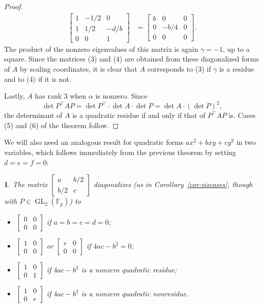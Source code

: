 \documentclass[10pt,a4paper]{amsart}
\numberwithin{equation}{section}
\numberwithin{figure}{section}
\theoremstyle{definition}
\theoremstyle{remark}
\theoremstyle{plain}
\theoremstyle{plain}
\newtheorem{cor}{\protect\corollaryname}[section]
\theoremstyle{definition}
\theoremstyle{plain}
\theoremstyle{plain}
\providecommand{\corollaryname}{Corollary}
\newcommand{\F}{\mathbb{F}}
\newcommand{\GL}{\operatorname{GL}}
\begin{document}
\begin{proof}
\begin{align*}
\begin{bmatrix}
			1 & -1/2 & 0\\
			1 & 1/2 & -d/b\\
			0 & 0 & 1
		\end{bmatrix}
		&=
		\begin{bmatrix}
			b&0&0\\
			0&-b/4&0\\
			0&0&0
		\end{bmatrix}.
	\end{align*}
	The product of the nonzero eigenvalues of this matrix is again $\gamma=-1$, up to a square. Since the matrices (3) and (4) are obtained from these diagonalized forms of $A$ by scaling coordinates, it is clear that $A$ corresponds to (3) if $\gamma$ is a residue and to (4) if it is not.
	
	Lastly, $A$ has rank $3$ when $\alpha$ is nonzero. Since
	\begin{equation*}
	\det P^\top AP=\det P^\top \cdot\det A\cdot\det P=\det A\cdot(\det P)^2,
	\end{equation*}
	the determinant of $A$ is a quadratic residue if and only if that of $P^\top AP$ is. Cases (5) and (6) of the theorem follow.
	\end{proof}
	
	We will also need an analogous result for quadratic forms $ax^2+bxy+cy^2$ in two variables, which follows immediately from the previous theorem by setting $d=e=f=0$:
	\begin{cor}\label{cor:diag-P1}
	The matrix $\left[\begin{smallmatrix}a&b/2\\b/2&c\end{smallmatrix}\right]$ diagonalizes (as in Corollary~\ref{cor:sixcases}, though with $P \in \GL_2(\F_p)$) to
	\begin{itemize}
	\item $\left[\begin{smallmatrix}0&0\\0&0\end{smallmatrix}\right]$ if $a=b=c=d=0$;
	\item $\left[\begin{smallmatrix}1&0\\0&0\end{smallmatrix}\right]$ or $\left[\begin{smallmatrix}r&0\\0&0\end{smallmatrix}\right]$ if $4ac-b^2=0$;
	\item $\left[\begin{smallmatrix}1&0\\0&1\end{smallmatrix}\right]$ if $4ac-b^2$ is a nonzero quadratic residue;
	\item $\left[\begin{smallmatrix}1&0\\0&r\end{smallmatrix}\right]$ if $4ac-b^2$ is a nonzero quadratic nonresidue.
	\end{itemize}
	\end{cor}
\end{document}
